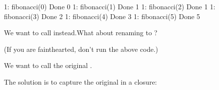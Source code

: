 \documentclass[letterpaper,10pt,english]{sphinxmanual}
\begin{document}
\begin{sphinxVerbatim}[commandchars=\\\{\}]
  1: fibonacci(0)
Done
0
  1: fibonacci(1)
Done
1
  1: fibonacci(2)
Done
1
  1: fibonacci(3)
Done
2
  1: fibonacci(4)
Done
3
  1: fibonacci(5)
Done
5
\end{sphinxVerbatim}

We want  to call  instead.What about renaming  to ?

\begin{sphinxVerbatim}[commandchars=\\\{\}]
  
    
\end{sphinxVerbatim}

(If you are faint\sphinxhyphen{}hearted, don’t run the above code.)

We want  to call the original .

The solution is to capture the original  in a closure:
\end{document}
